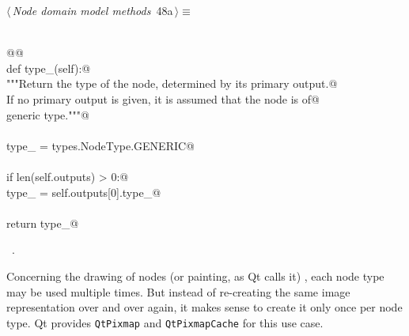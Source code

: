 \documentclass[
    a4paper,      %
    10pt,         %
    openright,    %
    notitlepage,  %
    parskip=half, %
]{scrreprt}       %
\theoremstyle{definition}                    %
\begin{document}
\begin{flushleft} \small
\begin{minipage}{\linewidth}\label{scrap63}\raggedright\small
{} $\langle\,${\itshape Node domain model methods}\nobreak\ {\footnotesize {48a}}$\,\rangle\equiv$
\vspace{-1exm}
\begin{list}{}{} \item
\mbox{}\lstinline@@\\
\mbox{}\lstinline@    @{\normalfont \fontfamily @}\lstinline@property@\\
\mbox{}\lstinline@    def type_(self):@\\
\mbox{}\lstinline@        """Return the type of the node, determined by its primary output.@\\
\mbox{}\lstinline@        If no primary output is given, it is assumed that the node is of@\\
\mbox{}\lstinline@        generic type."""@\\
\mbox{}\lstinline@@\\
\mbox{}\lstinline@        type_ = types.NodeType.GENERIC@\\
\mbox{}\lstinline@@\\
\mbox{}\lstinline@        if len(self.outputs) > 0:@\\
\mbox{}\lstinline@            type_ = self.outputs[0].type_@\\
\mbox{}\lstinline@@\\
\mbox{}\lstinline@        return type_@\\
\mbox{}\lstinline@@{\NWsep}
\end{list}
\vspace{-1.5ex}
\footnotesize
\begin{list}{}{\setlength{\itemsep}{-\parsep}\setlength{\itemindent}{-\leftmargin}}
\item \NWtxtMacroRefIn\ .

\item{}
\end{list}
\end{minipage}\vspace{4ex}
\end{flushleft}
Concerning the drawing of nodes (or painting, as Qt calls it) , each node type
may be used multiple times. But instead of re-creating the same image
representation over and over again, it makes sense to create it only once per
node type. Qt provides \verb+QtPixmap+ and \verb+QtPixmapCache+ for this use case.
\end{document}
